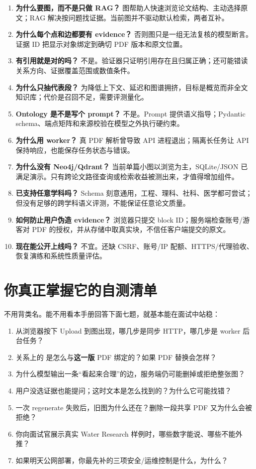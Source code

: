 \documentclass[UTF8,11pt,a4paper,fontset=fandol]{ctexart}
\newcommand{\code}[1]{\texttt{\footnotesize\detokenize{#1}}}
\newcommand{\term}[1]{\textbf{#1}}
\begin{document}
\begin{enumerate}
\item \textbf{为什么要图，而不是只做 RAG？} 图帮助人快速浏览论文结构、主动选择原文；RAG 解决按问题找证据。当前图并不驱动默认检索，两者互补。
\item \textbf{为什么每个点和边都要有 evidence？} 否则图只是一组无法复核的模型断言。证据 ID 把显示对象绑定到确切 PDF 版本和原文位置。
\item \textbf{有引用就是对的吗？} 不是。验证器只证明引用存在且归属正确；还可能错读关系方向、证据覆盖范围或数值条件。
\item \textbf{为什么只抽代表段？} 为降低上下文、延迟和图谱拥挤，目标是概览而非全文知识库；代价是召回不足，需要评测量化。
\item \textbf{Ontology 是不是写个 prompt？} 不是。Prompt 提供语义指导；Pydantic schema、端点矩阵和来源校验在模型之外执行硬约束。
\item \textbf{为什么用 worker？} 真 PDF 解析曾导致 API 进程退出；隔离长任务让 API 保持响应，也能保存任务状态与错误。
\item \textbf{为什么没有 Neo4j/Qdrant？} 当前单篇小图以浏览为主，SQLite/JSON 已满足演示。只有跨论文路径查询或检索收益被测出来，才值得增加组件。
\item \textbf{已支持任意学科吗？} Schema 刻意通用，工程、理科、社科、医学都可尝试；但没有足够的跨学科语义评测，不能保证任意论文质量。
\item \textbf{如何防止用户伪造 evidence？} 浏览器只提交 block ID；服务端检查账号/游客对 PDF 的授权，并从存储中取真实块，不信任客户端提交的原文。
\item \textbf{现在能公开上线吗？} 不宜。还缺 CSRF、账号/IP 配额、HTTPS/代理验收、恢复演练和系统性质量评估。
\end{enumerate}

\section{你真正掌握它的自测清单}

不用背类名。能不用看本手册回答下面七题，就基本能在面试中站稳：
\begin{enumerate}
\item 从浏览器按下 Upload 到图出现，哪几步是同步 HTTP，哪几步是 worker 后台任务？
\item 关系上的 \code{block_id} 是怎么与\term{这一版} PDF 绑定的？如果 PDF 替换会怎样？
\item 为什么模型输出一条“看起来合理”的边，服务端仍可能删掉或拒绝整张图？
\item 用户没选证据也能提问；这时文本是怎么找到的？为什么它可能找错？
\item 一次 regenerate 失败后，旧图为什么还在？删除一段共享 PDF 又为什么会被拒绝？
\item 你向面试官展示真实 Water Research 样例时，哪些数字能说、哪些不能外推？
\item 如果明天公网部署，你最先补的三项安全/运维控制是什么，为什么？
\end{enumerate}
\end{document}
